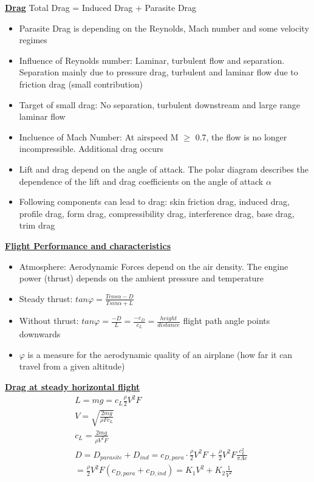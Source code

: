 \documentclass[9pt, landscape, fleqn]{scrartcl}
\begin{document}
\begin{multicols*}{3}
\underline{\textbf{Drag}}
Total Drag = Induced Drag + Parasite Drag 
\begin{itemize}
    \item Parasite Drag is depending on the Reynolds, Mach number and some velocity regimes
    \item Influence of Reynolds number: Laminar, turbulent flow and separation. Separation mainly due to pressure drag, turbulent and laminar flow due to friction drag (small contribution)
    \item Target of small drag: No separation, turbulent downstream and large range laminar flow
    \item Incluence of Mach Number: At airspeed M $\geq$ 0.7, the flow is no longer incompressible. Additional drag occurs
    \item Lift and drag depend on the angle of attack. The polar diagram describes the dependence of the lift and drag coefficients on the angle of attack $\alpha$
    \item Following components can lead to drag: skin friction drag, induced drag, profile drag, form drag, compressibility drag, interference drag, base drag, trim drag
\end{itemize}
\underline{\textbf{Flight Performance and characteristics}}
\begin{itemize}
    \item Atmosphere: Aerodynamic Forces depend on the air density. The engine power (thrust) depends on the ambient pressure and temperature
    \item Steady thrust: $tan \varphi = \frac{T cos \alpha - D}{T sin \alpha + L}$
    \item Without thrust: $tan \varphi = \frac{-D}{L} = \frac{-c_D}{c_L} = \frac{height}{distance} $ flight path angle points downwards
    \item $\varphi$ is a measure for the aerodynamic quality of an airplane (how far it can travel from a given altitude)
\end{itemize}
\underline{\textbf{Drag at steady horizontal flight}}
\begin{align*}
    &L = mg = c_L \frac{\rho}{2} V^2 F \\
    &V = \sqrt{\frac{2mg}{\rho F c_L}} \\
    &c_L = \frac{2mg}{\rho V^2 F} \\
    &D = D_{parasite} + D_{ind} = c_{D,para} \cdot \frac{\rho}{2}V^2 F + \frac{\rho}{2} V^2 F \frac{c_L^2}{\pi \Lambda e} \\
    &= \frac{\rho}{2} V^2 F (c_{D,para} + c_{D,ind}) = K_1 V^2 + K_2 \frac{1}{V^2}

\end{align*}
\end{multicols*}
\end{document}
